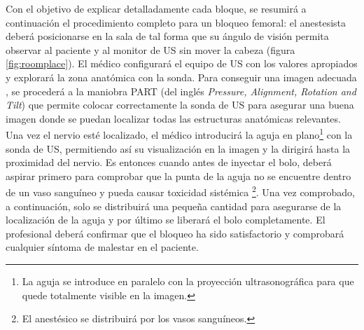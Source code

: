 Con el objetivo de explicar detalladamente cada bloque, se resumirá a continuación el procedimiento completo para un bloqueo femoral:
%
el anestesista deberá posicionarse en la sala de tal forma que su ángulo de visión permita observar al paciente y al monitor de \ac{US} %
sin mover la cabeza (figura \ref{fig:roomplace}). El médico configurará el equipo de \ac{US} con los valores apropiados y explorará la zona anatómica con la sonda. Para conseguir una imagen adecuada %
, se procederá a la maniobra PART (del inglés \emph{Pressure, Alignment, Rotation and Tilt}) que permite colocar correctamente la sonda de \ac{US} para asegurar una buena imagen donde se puedan localizar todas las estructuras anatómicas relevantes. Una vez el nervio esté localizado, el médico introducirá la aguja en plano\footnote{La aguja se introduce en paralelo con la proyección ultrasonográfica para que quede totalmente visible en la imagen.} con la sonda de \ac{US}, permitiendo así su visualización en la imagen y la dirigirá hasta la proximidad del nervio. Es entonces cuando antes de inyectar el bolo, deberá aspirar primero para comprobar que la punta de la aguja no se encuentre dentro de un vaso sanguíneo y pueda causar toxicidad sistémica \footnote{El anestésico se distribuirá por los vasos sanguíneos.}. Una vez comprobado, a continuación, solo se distribuirá una pequeña cantidad para asegurarse de la localización de la aguja y por último se liberará el bolo completamente. El profesional deberá confirmar que el bloqueo ha sido satisfactorio y comprobará cualquier síntoma de malestar en el paciente.


